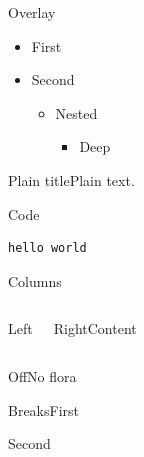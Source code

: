 \documentclass[aspectratio=43]{beamer}
\begin{document}
\begin{frame}{Overlay}
\begin{itemize}\item First\pause\item Second\begin{itemize}\item Nested\begin{itemize}\item Deep\end{itemize}\end{itemize}\end{itemize}
\end{frame}
\begin{frame}[plain]{Plain title}Plain text.\end{frame}
\begin{frame}[fragile]{Code}
\begin{verbatim}
hello world
\end{verbatim}
\end{frame}
\begin{frame}{Columns}\begin{columns}Left\begin{block}{Right}Content\end{block}\end{columns}\end{frame}
\floraoff
\begin{frame}{Off}No flora\end{frame}
\floraon
{}
\begin{frame}[allowframebreaks]{Breaks}First\par\framebreak Second\end{frame}
\end{document}
